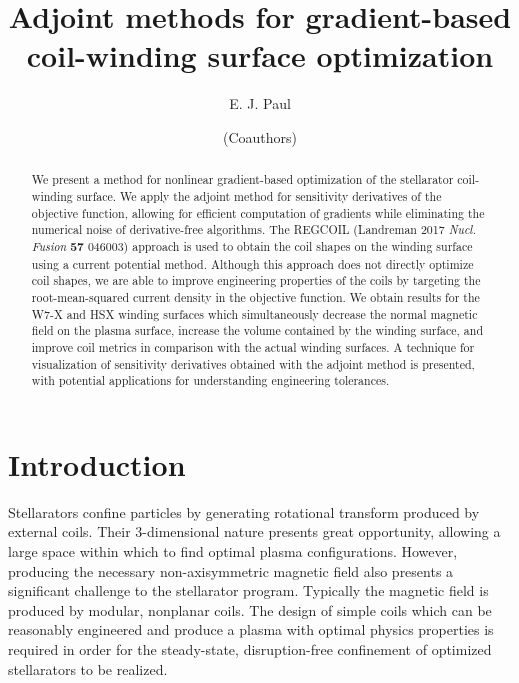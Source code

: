\documentclass[aps,unsortedaddress]{revtex4-1}
\begin{document}
\title{Adjoint methods for gradient-based coil-winding surface optimization}
\author{E. J. Paul}

\author{(Coauthors)}

\begin{abstract}
We present a method for nonlinear gradient-based optimization of the stellarator coil-winding surface. We apply the adjoint method for sensitivity derivatives of the objective function, allowing for efficient computation of gradients while eliminating the numerical noise of derivative-free algorithms. The REGCOIL (Landreman 2017 \textit{Nucl. Fusion} \textbf{57} 046003) approach is used to obtain the coil shapes on the winding surface using a current potential method. Although this approach does not directly optimize coil shapes, we are able to improve engineering properties of the coils by targeting the root-mean-squared current density in the objective function. We obtain results for the W7-X and HSX winding surfaces which simultaneously decrease the normal magnetic field on the plasma surface,  increase the volume contained by the winding surface, and improve coil metrics in comparison with the actual winding surfaces. A technique for visualization of sensitivity derivatives obtained with the adjoint method is presented, with potential applications for understanding engineering tolerances. 
\end{abstract}

\maketitle

\section{Introduction}

Stellarators confine particles by generating rotational transform produced by external coils. Their 3-dimensional nature presents great opportunity, allowing a large space within which to find optimal plasma configurations. However, producing the necessary non-axisymmetric magnetic field also presents a significant challenge to the stellarator program. Typically the magnetic field is produced by modular, nonplanar coils. The design of simple coils which can be reasonably engineered and produce a plasma with optimal physics properties is required in order for the steady-state, disruption-free confinement of optimized stellarators to be realized. 
\end{document}
